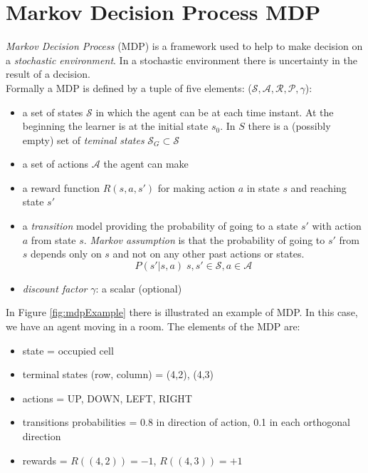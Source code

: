 \section{Markov Decision Process MDP}
\textit{Markov Decision Process} (MDP) is a framework used to help to make
decision on a \textit{stochastic environment}. In a stochastic environment there
is uncertainty in the result of a decision.\\ Formally a MDP is defined by a
tuple of five elements: ($\mathcal{S}, \mathcal{A}, \mathcal{R}, \mathcal{P}, \gamma$):
\begin{itemize}
	\item a set of states $\mathcal{S}$ in which the agent can be at each time instant.
		At the beginning the learner is at the initial state $s_{0}$. In $S$ there is
		a (possibly empty) set of \textit{teminal states}
		$\mathcal{S}_{G} \subset \mathcal{S}$

	\item a set of actions $\mathcal{A}$ the agent can make

	\item a reward function $R(s,a,s')$ for making action $a$ in state $s$ and reaching
		state $s'$

	\item a \textit{transition} model providing the probability of going to a
		state $s'$ with action $a$ from state $s$. \textit{Markov assumption} is
		that the probability of going to $s'$ from $s$ depends only on $s$ and not
		on any other past actions or states.
		\begin{equation}
			P(s'|s,a) \; s,s' \in \mathcal{S}, a \in \mathcal{A}
		\end{equation}

	\item \textit{discount factor} $\gamma$: a scalar (optional)
\end{itemize}

In Figure \ref{fig:mdpExample} there is illustrated an example of MDP. In this
case, we have an agent moving in a room. The elements of the MDP are:
\begin{itemize}
	\item state = occupied cell

	\item terminal states (row, column) = (4,2), (4,3)

	\item actions = UP, DOWN, LEFT, RIGHT

	\item transitions probabilities = 0.8 in direction of action, 0.1 in each
		orthogonal direction

	\item rewards = $R((4,2)) = -1$, $R((4,3)) = +1$
\end{itemize}

